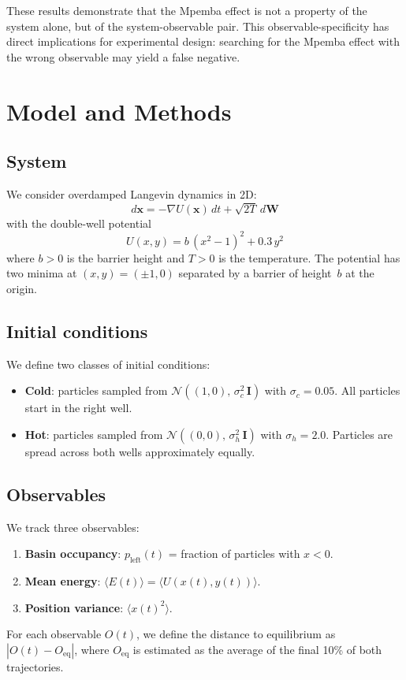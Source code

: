 \documentclass[aps,pre,reprint,superscriptaddress,showpacs]{revtex4-2}
\begin{document}
These results demonstrate that the Mpemba effect is not a property of the system
alone, but of the system-observable pair. This observable-specificity has direct
implications for experimental design: searching for the Mpemba effect with the
wrong observable may yield a false negative.

\section{Model and Methods}

\subsection{System}

We consider overdamped Langevin dynamics in 2D:
\begin{equation}
d\bm{x} = -\nabla U(\bm{x})\,dt + \sqrt{2T}\,d\bm{W}
\end{equation}
with the double-well potential
\begin{equation}
U(x,y) = b\,(x^2-1)^2 + 0.3\,y^2
\end{equation}
where $b > 0$ is the barrier height and $T > 0$ is the temperature. The
potential has two minima at $(x,y) = (\pm 1, 0)$ separated by a barrier of
height~$b$ at the origin.

\subsection{Initial conditions}

We define two classes of initial conditions:
\begin{itemize}
\item \textbf{Cold}: particles sampled from
  $\mathcal{N}((1, 0),\,\sigma_c^2\,\mathbf{I})$ with $\sigma_c = 0.05$. All
  particles start in the right well.
\item \textbf{Hot}: particles sampled from
  $\mathcal{N}((0, 0),\,\sigma_h^2\,\mathbf{I})$ with $\sigma_h = 2.0$.
  Particles are spread across both wells approximately equally.
\end{itemize}

\subsection{Observables}

We track three observables:
\begin{enumerate}
\item \textbf{Basin occupancy}: $p_\mathrm{left}(t)$ = fraction of particles
  with $x < 0$.
\item \textbf{Mean energy}: $\langle E(t)\rangle = \langle U(x(t), y(t))\rangle$.
\item \textbf{Position variance}: $\langle x(t)^2\rangle$.
\end{enumerate}
For each observable $O(t)$, we define the distance to equilibrium as
$|O(t) - O_\mathrm{eq}|$, where $O_\mathrm{eq}$ is estimated as the average
of the final 10\% of both trajectories.
\end{document}
